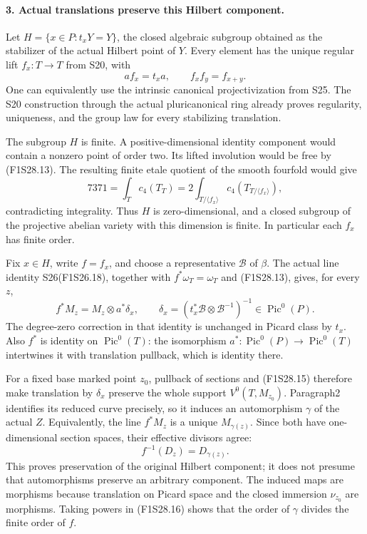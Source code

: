 \paragraph{3. Actual translations preserve this Hilbert component.}
Let $H=\{x\in P:t_xY=Y\}$, the closed algebraic subgroup
obtained as the stabilizer of the actual Hilbert point
of $Y$. Every element has the unique regular lift
$f_x:T\to T$ from S20, with
\[
                a f_x=t_x a,\qquad f_x f_y=f_{x+y}.
 \tag{F1S28.13}
\]
One can equivalently use the intrinsic canonical
projectivization from S25. The S20 construction through
the actual pluricanonical ring already proves regularity,
uniqueness, and the group law for every stabilizing
translation.

The subgroup $H$ is finite. A positive-dimensional
identity component would contain a nonzero point of
order two. Its lifted involution would be free by
(F1S28.13). The resulting finite etale quotient of the
smooth fourfold would give
\[
              7371=\int_Tc_4(T_T)
                       =2\int_{T/\langle f_x\rangle}
                                      c_4(T_{T/\langle f_x\rangle}),
 \tag{F1S28.14}
\]
contradicting integrality. Thus $H$ is zero-dimensional,
and a closed subgroup of the projective abelian variety
with this dimension is finite. In particular each $f_x$
has finite order.

Fix $x\in H$, write $f=f_x$, and choose a representative
$\mathcal B$ of $\beta$. The actual line identity
S26(F1S26.18), together with $f^*\omega_T=\omega_T$
and (F1S28.13), gives, for every $z$,
\[
 f^*M_z=M_z\otimes a^*\delta_x,
 \qquad
 \delta_x=(t_x^*\mathcal B\otimes\mathcal B^{-1})^{-1}
                                      \in\operatorname{Pic}^0(P).
 \tag{F1S28.15}
\]
The degree-zero correction in that identity is unchanged
in Picard class by $t_x$. Also $f^*$ is identity on
$\operatorname{Pic}^0(T)$: the isomorphism
$a^*:\operatorname{Pic}^0(P)\to\operatorname{Pic}^0(T)$
intertwines it with translation pullback, which is
identity there.

For a fixed base marked point $z_0$, pullback of sections
and (F1S28.15) therefore make translation by $\delta_x$
preserve the whole support $V^0(T,M_{z_0})$. Paragraph2
identifies its reduced curve precisely, so it induces
an automorphism $\gamma$ of the actual $Z$. Equivalently,
the line $f^*M_z$ is a unique $M_{\gamma(z)}$. Since
both have one-dimensional section spaces, their effective
divisors agree:
\[
                              f^{-1}(D_z)=D_{\gamma(z)}.
 \tag{F1S28.16}
\]
This proves preservation of the original Hilbert component;
it does not presume that automorphisms preserve an arbitrary
component. The induced maps are morphisms because translation
on Picard space and the closed immersion $\nu_{z_0}$ are
morphisms. Taking powers in (F1S28.16) shows that the order
of $\gamma$ divides the finite order of $f$.

